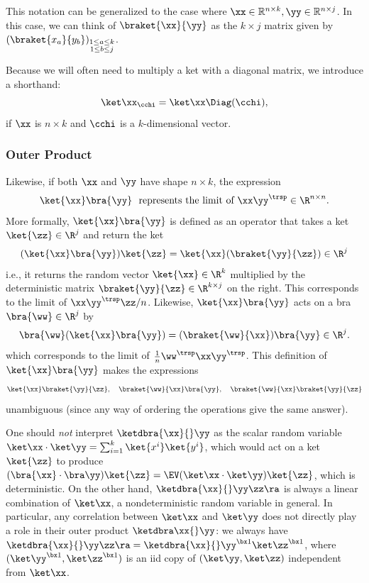 This notation can be generalized to the case where $\xx \in \mathbb{R}^{n \times k}, \yy \in \mathbb{R}^{n \times j}$. In this case, we can think of $\braket{\xx}{\yy}$ as the $k \times j$ matrix given by $(\braket{x_a}{y_b})_{\substack{1 \leq a \leq k \\ 1 \leq b \leq j}}$.

Because we will often need to multiply a ket with a diagonal matrix, we introduce a shorthand:
\begin{equation}
  \ket\xx _{\cchi} = \ket\xx \Diag(\cchi),\label{eqn:multdiagnotation}
\end{equation}
if $\xx$ is $n\times k$ and $\cchi$ is a $k$-dimensional vector.

\subsubsection{Outer Product}
\label{sec:ket_outer}

Likewise, if both $\xx$ and $\yy$ have shape $n\times k$, the expression
\[
\ket{\xx}\bra{\yy}\ \text{ represents the limit of $\xx\yy^{\trsp}\in\R^{n\times n}$.}
\]
More formally,
$\ket{\xx}\bra{\yy}$ is defined as an operator that takes a ket $\ket{\zz}\in\R^{j}$
and return the ket
\[
(\ket{\xx}\bra{\yy})\ket{\zz}=\ket{\xx}(\braket{\yy}{\zz})\in\R^{j}
\]
i.e., it returns the random vector $\ket{\xx}\in\R^{k}$ multiplied
by the deterministic matrix $\braket{\yy}{\zz}\in\R^{k\times j}$
on the right. 
This corresponds to the limit of $\xx \yy^\trsp \zz/n$.
Likewise, $\ket{\xx}\bra{\yy}$ acts on a bra $\bra{\ww}\in\R^{j}$
by
\[
\bra{\ww}(\ket{\xx}\bra{\yy})=(\braket{\ww}{\xx})\bra{\yy}\in\R^{j}.
\]
which corresponds to the limit of $\frac 1 n \ww^\trsp \xx \yy^\trsp$.
This definition of $\ket{\xx}\bra{\yy}$ makes the expressions
\[
\ket{\xx}\braket{\yy}{\zz},\quad\braket{\ww}{\xx}\bra{\yy},\quad\braket{\ww}{\xx}\braket{\yy}{\zz}
\]
unambiguous (since any way of ordering the operations give the same
answer).

\begin{rem}
One should \emph{not} interpret $\ketdbra{\xx}{}\yy$ as the scalar random variable $\ket\xx \cdot \ket \yy  = \sum_{i=1}^k \ket {x^i}\ket{y^i}$, which would act on a ket $\ket{\zz}$ to produce $(\bra{\xx} \cdot \bra\yy)\ket{\zz} = \EV (\ket\xx \cdot \ket \yy)\ket{\zz} $, which is deterministic.
On the other hand, $\ketdbra{\xx}{}\yy \zz \ra$ is always a linear combination of $\ket \xx$, a nondeterministic random variable in general.
In particular, any correlation between $\ket \xx$ and $\ket \yy$ does not directly play a role in their outer product $\ketdbra\xx{}\yy$: we always have $\ketdbra{\xx}{}\yy \zz \ra = \ketdbra{\xx}{}\yy^{\bx1} \ket\zz^{\bx1}$, where $(\ket \yy^{\bx1}, \ket \zz^{\bx1})$ is an iid copy of $(\ket \yy, \ket \zz)$ independent from $\ket \xx$.
\end{rem}


